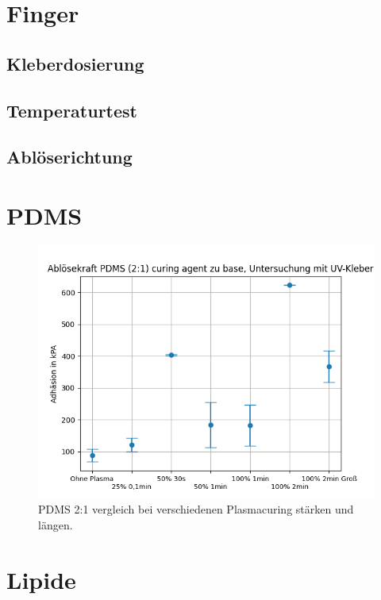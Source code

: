 \section{Finger}

\subsection{Kleberdosierung}
	

	
\subsection{Temperaturtest}
\subsection{Ablöserichtung}


\section{PDMS}

	\begin{figure}[h]
		\includegraphics[width=14cm]{test}
		\caption{PDMS 2:1 vergleich bei verschiedenen Plasmacuring stärken und längen.}
	\end{figure}

\section{Lipide}


